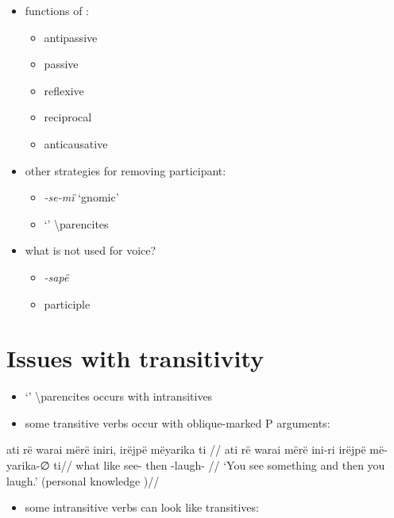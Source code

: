 \documentclass{memoir}
\begin{document}
\begin{itemize}
\tightlist
\item
  functions of :

  \begin{itemize}
  \tightlist
  \item
    antipassive
  \item
    passive
  \item
    reflexive
  \item
    reciprocal
  \item
    anticausative
  \end{itemize}
\item
  other strategies for removing participant:

  \begin{itemize}
  \tightlist
  \item
    \emph{-se-mï} `gnomic'
  \item
     `' \textbackslash parencites
  \end{itemize}
\item
  what is not used for voice?

  \begin{itemize}
  \tightlist
  \item
    \emph{-sapë}
  \item
    participle
  \end{itemize}
\end{itemize}

\section{Issues with transitivity}

\begin{itemize}
\tightlist
\item
   `' \textbackslash parencites occurs with
  intransitives
\item
  some transitive verbs occur with oblique-marked P arguments:
\end{itemize}

\ex \label{convrisamaj-1}
\begingl \glpreamble ati rë warai mërë iniri, irëjpë mëyarika ti //
\gla ati rë warai mërë ini-ri irëjpë më-yarika-∅ ti//
\glb what  like  see- then -laugh- //
\glft ‘You see something and then you laugh.’ (personal knowledge
)//
\endgl
\xe

\begin{itemize}
\tightlist
\item
  some intransitive verbs can look like transitives:
\end{itemize}
\end{document}
